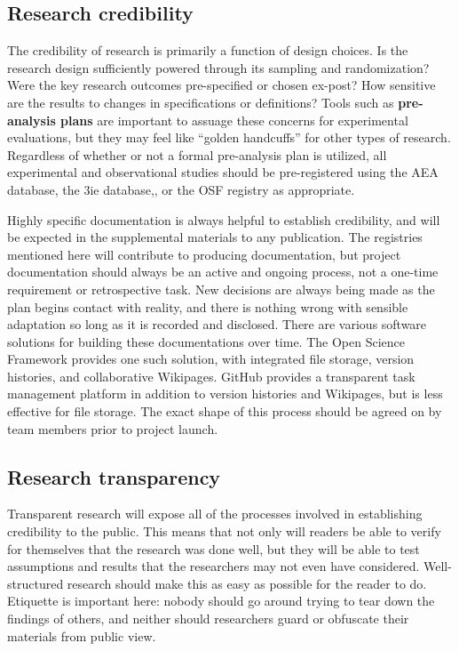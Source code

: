 \subsection{Research credibility}

The credibility of research is primarily a function of design choices.\cite{ioannidis2005most}
Is the research design sufficiently powered through its sampling and randomization?
Were the key research outcomes pre-specified or chosen ex-post?
How sensitive are the results to changes in specifications or definitions?
Tools such as \textbf{pre-analysis plans} are important to assuage these concerns for experimental evaluations,
but they may feel like ``golden handcuffs'' for other types of research.\cite{olken2015promises}
Regardless of whether or not a formal pre-analysis plan is utilized,
all experimental and observational studies should be pre-registered using the AEA database, the 3ie database,, or the OSF registry as appropriate.

Highly specific documentation is always helpful to establish credibility,
and will be expected in the supplemental materials to any publication.
The registries mentioned here will contribute to producing documentation,
but project documentation should always be an active and ongoing process,
not a one-time requirement or retrospective task.
New decisions are always being made as the plan begins contact with reality,
and there is nothing wrong with sensible adaptation so long as it is recorded and disclosed.
There are various software solutions for building these documentations over time.
The Open Science Framework provides one such solution,
with integrated file storage, version histories, and collaborative Wikipages.
GitHub provides a transparent task management platform
in addition to version histories and Wikipages, but is less effective for file storage.
The exact shape of this process should be agreed on by team members prior to project launch.

\subsection{Research transparency}

Transparent research will expose all of the processes involved in establishing credibility to the public.
This means that not only will readers be able to verify for themselves that the research was done well,
but they will be able to test assumptions and results that the researchers may not even have considered.
Well-structured research should make this as easy as possible for the reader to do.
Etiquette is important here: nobody should go around trying to tear down the findings of others,
and neither should researchers guard or obfuscate their materials from public view.

